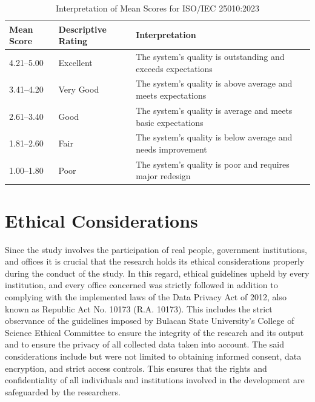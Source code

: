 \begin{table}[H]
	\centering
	\singlespacing
	\caption{Interpretation of Mean Scores for ISO/IEC 25010:2023}
	\label{inter:iso}
	\renewcommand{\arraystretch}{1.1}
	\begin{tabularx}{\linewidth}{p{}p{}X}
		\toprule 
		\textbf{Mean Score} & \textbf{Descriptive Rating} & \textbf{Interpretation} \\
		\midrule
		4.21–5.00 & Excellent &  The system’s quality is outstanding and exceeds expectations \\
		3.41–4.20 & Very Good & The system’s quality is above average and meets expectations \\
		2.61–3.40 & Good & The system’s quality is average and meets basic expectations \\
		1.81–2.60 & Fair & The system’s quality is below average and needs improvement \\
		1.00–1.80 & Poor & The system’s quality is poor and requires major redesign \\
		\bottomrule
	\end{tabularx}
\end{table}

\section{Ethical Considerations}
Since the study involves the participation of real people, government institutions, and offices it is crucial that the research holds its ethical considerations properly during the conduct of the study. In this regard, ethical guidelines upheld by every institution, and every office concerned was strictly followed in addition to complying with the implemented laws of the Data Privacy Act of 2012, also known as Republic Act No. 10173 (R.A. 10173). This includes the strict observance of the guidelines imposed by Bulacan State University’s College of Science Ethical Committee to ensure the integrity of the research and its output and to ensure the privacy of all collected data taken into account. The said considerations include but were not limited to obtaining informed consent, data encryption, and strict access controls. This ensures that the rights and confidentiality of all individuals and institutions involved in the development are safeguarded by the researchers.

